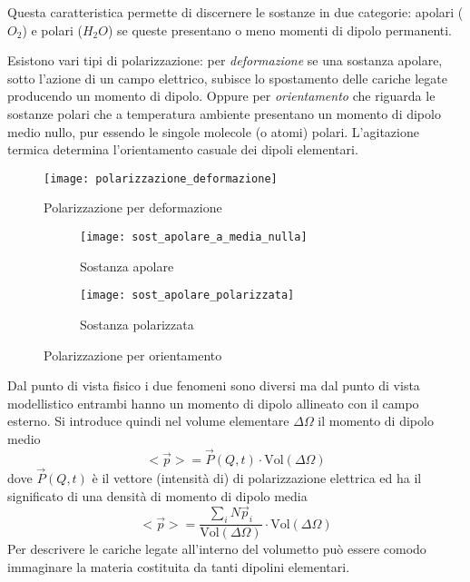 Questa caratteristica permette di discernere le sostanze in due categorie: apolari ($O_2$) e polari
($H_2O$) se queste presentano o meno momenti di dipolo permanenti.

Esistono vari tipi di polarizzazione: per \textit{deformazione} se una sostanza apolare, sotto 
l'azione di un campo elettrico, subisce lo spostamento delle cariche legate producendo 
un momento di dipolo.
Oppure per \textit{orientamento} che riguarda le sostanze polari che a temperatura ambiente
presentano un momento di dipolo medio nullo, pur essendo le singole molecole (o atomi) polari.
L'agitazione termica determina l'orientamento casuale dei dipoli elementari.

\begin{figure}[H]
 \centering
 \texttt{[image: polarizzazione\_deformazione]}
 \caption{Polarizzazione per deformazione}
\end{figure}


\begin{figure}[H]
 \begin{subfigure}{.5\textwidth}
 \centering
 \texttt{[image: sost\_apolare\_a\_media\_nulla]}
 \caption{Sostanza apolare}
 \end{subfigure} 
 \begin{subfigure}{.5\textwidth}
\centering
 \texttt{[image: sost\_apolare\_polarizzata]}
 \caption{Sostanza polarizzata}
 \end{subfigure}
 \caption{Polarizzazione per orientamento}
\end{figure}

Dal punto di vista fisico i due fenomeni sono diversi ma dal punto di vista modellistico
entrambi hanno un momento di dipolo allineato con il campo esterno.
Si introduce quindi nel volume elementare $\Delta\Omega$ il momento di dipolo medio
$$
<\vec{p}> = \vec{P}(Q,t)\cdot \text{Vol}(\Delta\Omega)
$$
dove $\vec{P}(Q,t)$ è il vettore (intensità di) di polarizzazione elettrica ed ha il significato 
di una densità di momento di dipolo media
$$
<\vec{p}> = \frac{\sum_i N\vec{p}_i}{\text{Vol}(\Delta\Omega)}\cdot \text{Vol}(\Delta\Omega)
$$
Per descrivere le cariche legate all'interno del volumetto può essere comodo immaginare la materia
costituita da tanti dipolini elementari.

